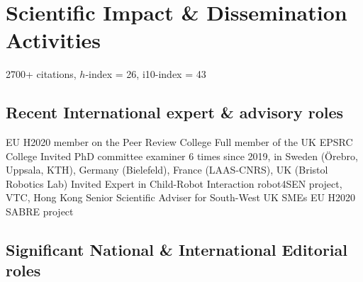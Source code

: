 \documentclass[10pt,a4paper]{moderncv}        %
\begin{document}
\section{Scientific Impact \& Dissemination Activities}

 {} {} {}
\vspace{0.2em} {2700+ citations, $h$-index = 26, i10-index = 43 } {} {} {}

\subsection{Recent International expert \& advisory roles}

 {EU H2020 member on the Peer Review College} {} {} {} {}
 {Full member of the UK EPSRC College} {} {} {} {}
 {Invited PhD committee examiner} {6 times since 2019, in Sweden
(Örebro, Uppsala, KTH), Germany (Bielefeld), France (LAAS-CNRS), UK (Bristol
Robotics Lab)} {} {} {}
 {Invited Expert in Child-Robot Interaction} {robot4SEN project, VTC, Hong Kong} {} {} {}
 {Senior Scientific Adviser for South-West UK SMEs} {EU H2020 SABRE project} {} {} {} {}

\subsection{Significant National \& International Editorial roles}
 {} {} {}
 {} {} {}
 {} {} {}
 {} {} {}
\end{document}
